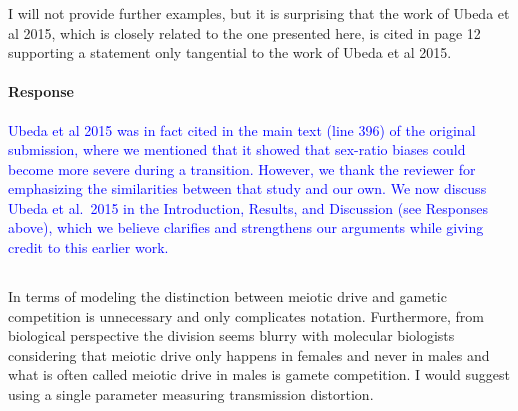 \documentclass[10pt,letterpaper]{article}
\begin{document}
\noindent\subsubsection{}
I will not provide further examples, but it is surprising that the work of Ubeda et al 2015, which is closely related to the one presented here, is cited in page 12 supporting a statement only tangential to the work of Ubeda et al 2015.

\noindent\paragraph{Response}
\textcolor{blue}{
Ubeda et al 2015 was in fact cited in the main text (line 396) of the original submission, where we mentioned that it showed that sex-ratio biases could become more severe during a transition.
However, we thank the reviewer for emphasizing the similarities between that study and our own.
We now discuss Ubeda et al.\ 2015 in the Introduction, Results, and Discussion (see Responses above), which we believe clarifies and strengthens our arguments while giving credit to this earlier work.}

\noindent\subsection{}
In terms of modeling the distinction between meiotic drive and gametic competition is unnecessary and only complicates notation. Furthermore, from biological perspective the division seems blurry with molecular biologists considering that meiotic drive only happens in females and never in males and what is often called meiotic drive in males is gamete competition. I would suggest using a single parameter measuring transmission distortion.
\end{document}
